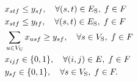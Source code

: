 \documentclass[10pt, letterpaper]{IEEEtran}
\begin{document}
\begin{CJK}{UTF8}{ipxm}
\begin{subequations}
\begin{align}
  &x_{stf} \le y_{sf}, \quad \forall (s,t) \in E_{\rm{S}}, \; f \in F \label{OSA-PSO_j} \\
  &x_{stf} \le y_{tf}, \quad \forall (s,t) \in E_{\rm{S}}, \; f \in F \label{OSA-PSO_k} \\
  &\sum_{u \in V_{\rm{U}}} x_{usf} \geq y_{sf} , \quad \forall s \in V_{\rm{S}}, \; f \in F \label{OSA-PSO_l} \\
  &x_{ijf} \in \{0,1\}, \quad \forall (i,j) \in E, \; f \in F \label{OSA-PSO_m} \\
  &y_{sf} \in \{0,1\}, \quad \forall s \in V_{\rm{S}}, \; f \in F. \label{OSA-PSO_n}
  \end{align}
\end{subequations}

\end{CJK}
\end{document}
